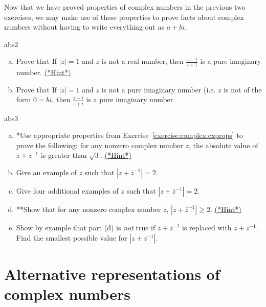 Now that we have proved properties of complex numbers in the previous two exercises, we may make use of these properties to prove facts about complex numbers  without having to write everything out as $a + bi$.  

\begin{exercise}{abs2}
\begin{enumerate}[(a)]
\item
Prove that  If $|z| = 1$ and $z$ is not a real number, then $\frac{z - 1}{z+1}$ is a pure imaginary number. 
\hyperref[sec:complex:hints]{(*Hint*)}
\item
Prove that  If $|z| = 1$ and $z$ is not a pure imaginary number (i.e. $z$ is not of the form $0 = bi$, then $\frac{z - i}{z+i}$ is a pure imaginary number. 
\end{enumerate}
\end{exercise}

\begin{exercise}{abs3}
\begin{enumerate}[(a)]
\item *Use appropriate properties from Exercise~\ref{exercise:complex:cxprops} to prove the following: for any nonzero complex number $z$, the absolute value of $z + \bar{z}^{-1}$ is greater than $\sqrt{3}$. 
\hyperref[sec:complex:hints]{(*Hint*)}

\item Give an example of $z$ such that $|z + \bar{z}^{-1}| = 2$. 
\item Give four additional examples of $z$ such that $|z + \bar{z}^{-1}| = 2$. 
\item **Show that for any nonzero complex number $z$, $|z + \bar{z}^{-1}| \ge 2$. 
\hyperref[sec:complex:hints]{(*Hint*)}
\item Show by example that part (d) is \emph{not} true if $z + \bar{z}^{-1}$ is replaced with $z + z^{-1}$.  Find the smallest possible 
value for $|z + z^{-1}|$.
\end{enumerate}
\end{exercise}


\section{Alternative representations of complex numbers\quad
{}}
\label{sec:ComplexNumbers:Graphical}


